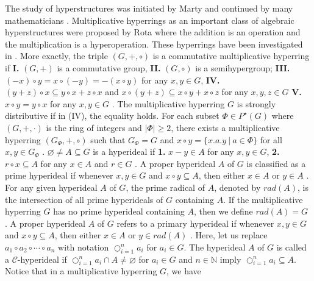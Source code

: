 \documentclass[preprint,review,10pt]{amsart}
\theoremstyle{definition}
\theoremstyle{remark}
\numberwithin{equation}{section}
\begin{document}
The study of hyperstructures was initiated by Marty \cite{marty} and continued by many mathematicians \cite{f1,f2,f4,f5,x2,x1,f11,f7,f17,f8,f9}. Multiplicative hyperrings as  an important class of algebraic hyperstructures were proposed by Rota \cite{f14} where   the addition is an operation and the multiplication is a hyperoperation.  These hyperrings  have been   investigated in \cite{ameri, ameri5, ameri6,    Ciampi, Kamali,  f16}. %
More exactly,  the triple  $(G,+,\circ)$ is a  commutative multiplicative hyperring  if  {\bf I.} $(G,+)$ is a commutative group,  {\bf II.} $(G,\circ)$ is a semihypergroup; 
{\bf III.} $(-x)\circ y =x\circ (-y) =  -(x\circ y)$ for any $x, y \in G$,
{\bf IV.}  $(y+z)\circ x \subseteq y\circ x+z\circ x$ and  $x\circ (y+z) \subseteq x\circ y+x\circ z$ for any $x, y, z \in G $
{\bf V.} $x \circ y =y \circ x$ for any $x,y \in G$  \cite{f10}. The multiplicative hyperring $G$ is  strongly distributive if in (IV), the equality holds. For each subset $\Phi \in P^\star(G)$   where $(G,+,\cdot)$ is the ring of integers  and $\vert \Phi \vert \geq 2$, there exists a multiplicative hyperring $(G_\Phi,+,\circ)$ such that  $G_{\Phi}=G$ and  $x \circ y =\{x.a.y\ \vert \ a \in \Phi\}$ for all $x,y\in G_\Phi$ \cite{das}.
 $\varnothing \neq  A \subseteq G$ is  a  hyperideal  if {\bf 1.}  $x - y \in A$ for any $x, y \in G$,  {\bf 2.} $r \circ x \subseteq A$ for any $x \in A$ and $r \in G$ \cite{f10}.
 A proper hyperideal $A$ of   $G$ is classified as a prime hyperideal if whenever $x,y \in G$ and $x \circ y \subseteq A$, then either $x \in A$ or $y \in A$ \cite{das}.
  For any given hyperideal $A$ of $G$, the prime radical of $A$,  denoted by $rad (A)$, is the intersection of all prime hyperideals of $G$ containing  $A$. If the multiplicative hyperring $G$  has no prime hyperideal containing $A$, then we  define $rad(A)=G$ \cite{das}. A proper hyperideal $A$ of   $G$ refers to  a primary hyperideal if whenever $x,y \in G$ and $x \circ y \subseteq A$, then either $x \in A$ or $y \in rad(A)$ \cite{das}. Here, let us replace $a_1 \circ a_2 \circ \cdots \circ a_n$ with notation  $\bigcirc_{i=1}^n a_i$ for $a_i \in G$. The hyperideal $A$ of $G$ is called  a $\mathcal{C}$-hyperideal  if $\bigcirc_{i=1}^n a_i \cap A \neq \varnothing $ for $a_i \in G$ and $n \in \mathbb{N}$ imply $\bigcirc_{i=1}^n a_i \subseteq A$. Notice that in a multiplicative hyperring $G$, we have
\end{document}

